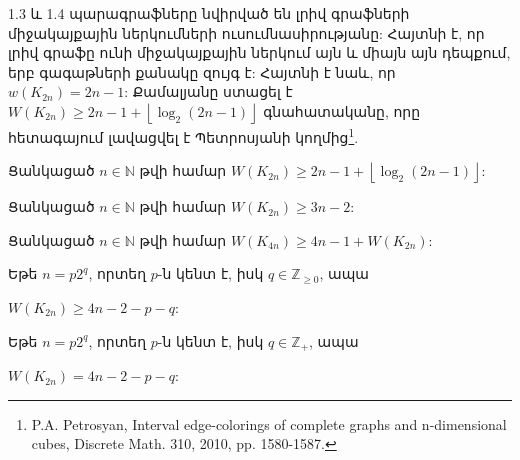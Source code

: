 1.3 և 1.4 պարագրաֆները նվիրված են լրիվ գրաֆների միջակայքային ներկումների ուսումնասիրությանը: Հայտնի է, որ լրիվ գրաֆը ունի միջակայքային ներկում այն և միայն այն դեպքում, երբ գագաթների քանակը զույգ է: Հայտնի է նաև, որ $w(K_{2n})=2n-1$: Քամալյանը ստացել է $W(K_{2n}) \geq 2n-1 + \left\lfloor \log_2(2n-1) \right\rfloor$ գնահատականը, որը հետագայում լավացվել է Պետրոսյանի կողմից\footnote{P.A. Petrosyan, Interval edge-colorings of complete graphs and n-dimensional cubes, Discrete Math. 310, 2010, pp. 1580-1587.}.
\begin{hide}
\begin{theorem}\cite{Kamalian1990}
Ցանկացած $n\in \mathbb{N}$ թվի համար $W(K_{2n}) \geq 2n-1 + \left\lfloor \log_2(2n-1) \right\rfloor$:
\end{theorem}
\begin{theorem}\cite{Petrosyan2010}\label{tPetrosyan3n2}
Ցանկացած $n\in \mathbb{N}$ թվի համար $W(K_{2n}) \geq 3n-2$:
\end{theorem}
\begin{theorem}\cite{Petrosyan2010}\label{tPetrosyan4n}
Ցանկացած $n\in \mathbb{N}$ թվի համար $W(K_{4n}) \geq 4n-1 + W(K_{2n})$:
\end{theorem}
\end{hide}
\begin{theorem}
\label{t2_complete_pq} Եթե $n=p2^{q}$, որտեղ $p$-ն կենտ է, իսկ $q \in \mathbb{Z}_{\geq 0}$, ապա
\begin{center}
$W\left(K_{2n}\right)\geq 4n-2-p-q$:
\end{center}
\end{theorem}

\begin{hide}
\begin{hypothesis}
\label{h1_complete_pq}
Եթե $n=p2^{q}$, որտեղ $p$-ն կենտ է, իսկ $q \in \mathbb{Z}_+$, ապա
\begin{center}
$W\left(K_{2n}\right) = 4n-2-p-q$:
\end{center}
\end{hypothesis}
\end{hide}

